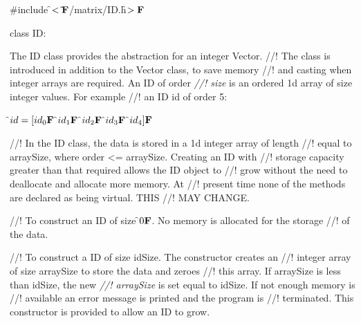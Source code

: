 
\indent \#include \f$<\tilde{ }{\bf F}$/matrix/ID.h\f$>{\bf F}$

\indent class ID:


\indent The ID class provides the abstraction for an integer Vector. 
//! The class is introduced in addition to the Vector class, to save memory
//! and casting when integer arrays are required. An ID of order {\em
//! size} is an ordered 1d array of \p size integer values. For example
//! an ID id of order 5:

\indent\indent \f$id = [id_0{\bf F}$ \f$id_1{\bf F}$ \f$id_2{\bf F}$ \f$id_3{\bf F}$ \f$id_4]{\bf F}$

//! In the ID class, the data is stored in a 1d integer array of length
//! equal to arraySize, where order <= arraySize. Creating an ID with
//! storage capacity greater than that required allows the ID object to
//! grow without the need to deallocate and allocate more memory. At
//! present time none of the methods are declared as being virtual. THIS
//! MAY CHANGE.




//! To construct an ID of size \f$0{\bf F}$. No memory is allocated for the storage
//! of the data.


//! To construct a ID of size \p idSize. The constructor creates an
//! integer array of size \p arraySize to store the data and zeroes
//! this array. If \p arraySize is less than \p idSize, the new {\em
//! arraySize} is set equal to \p idSize. If not enough memory is
//! available an error message is printed and the program is
//! terminated. This constructor is provided to allow an ID to grow.  



